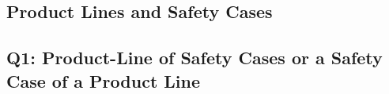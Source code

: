\documentclass[11pt]{article}
\begin{document}
\subsection{Product Lines and Safety Cases}
%
%
%
%
%
%
%
\subsection{Q1: Product-Line of Safety Cases or a Safety Case of a Product Line}
%
%
%
%
%
%
%
\end{document}
